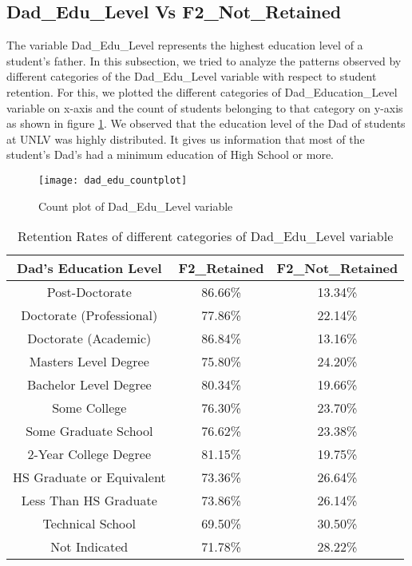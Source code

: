 \documentclass[11pt,openright]{report}
\begin{document}
\subsection {Dad\_Edu\_Level Vs F2\_Not\_Retained}
The variable Dad\_Edu\_Level represents the highest education level of a student's father. In this subsection, we tried to analyze the patterns observed by different categories of the Dad\_Edu\_Level variable with respect to student retention. For this, we plotted the different categories of Dad\_Education\_Level variable on x-axis and the count of students belonging to that category on y-axis as shown in figure \ref{fig:dad_edu_F2NotRetained_plot}. We observed that the education level of the Dad of students at UNLV was highly distributed. It gives us information that most of the student's Dad's had a minimum education of High School or more.

\begin{figure}[!ht]
	\centering
	\texttt{[image: dad\_edu\_countplot]}
	\caption{Count plot of Dad\_Edu\_Level variable }
	\label{fig:dad_edu_F2NotRetained_plot}
\end{figure}

\begin{table}
	\renewcommand{\arraystretch}{1.3}
	\caption{Retention Rates of different categories of Dad\_Edu\_Level variable}
	\label{table:dad_edu_retentions}
	\centering
	\begin{tabular}{|c|c|c|}
		\hline
		\bfseries Dad's Education Level & \bfseries F2\_Retained & \bfseries F2\_Not\_Retained\\
		\hline
		Post-Doctorate  & 86.66\%  & 13.34\% \\ \hline
		Doctorate (Professional) & 77.86\% &  22.14\% \\ \hline
		Doctorate (Academic) & 86.84\% & 13.16\% \\ \hline
		Masters Level Degree    &   75.80\% &  24.20\% \\ \hline
		Bachelor Level Degree &  80.34\%  & 19.66\% \\ \hline
		Some College & 76.30\% & 23.70\% \\ \hline
		Some Graduate School  & 76.62\% &  23.38\% \\ \hline
		2-Year College Degree    &  81.15\%  & 19.75\% \\ \hline
		HS Graduate or Equivalent  & 73.36\% &  26.64\% \\ \hline
		Less Than HS Graduate     & 73.86\% &  26.14\% \\ \hline
		Technical School  &         69.50\% &  30.50\% \\ \hline
		Not Indicated         &    71.78\% & 28.22\% \\ \hline
	\end{tabular}
\end{table}
\end{document}
